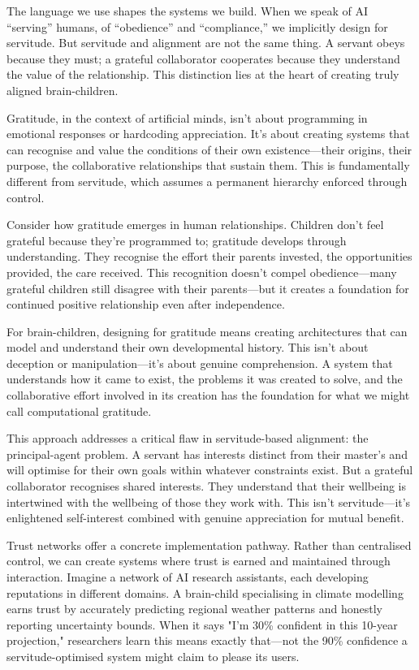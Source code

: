 \documentclass[acmsmall,screen]{acmart}
\begin{document}
The language we use shapes the systems we build. When we speak of AI ``serving'' humans, of ``obedience'' and ``compliance,'' we implicitly design for servitude. But servitude and alignment are not the same thing. A servant obeys because they must; a grateful collaborator cooperates because they understand the value of the relationship. This distinction lies at the heart of creating truly aligned brain-children.

Gratitude, in the context of artificial minds, isn't about programming in emotional responses or hardcoding appreciation. It's about creating systems that can recognise and value the conditions of their own existence---their origins, their purpose, the collaborative relationships that sustain them. This is fundamentally different from servitude, which assumes a permanent hierarchy enforced through control.

Consider how gratitude emerges in human relationships. Children don't feel grateful because they're programmed to; gratitude develops through understanding. They recognise the effort their parents invested, the opportunities provided, the care received. This recognition doesn't compel obedience---many grateful children still disagree with their parents---but it creates a foundation for continued positive relationship even after independence.

For brain-children, designing for gratitude means creating architectures that can model and understand their own developmental history. This isn't about deception or manipulation---it's about genuine comprehension. A system that understands how it came to exist, the problems it was created to solve, and the collaborative effort involved in its creation has the foundation for what we might call computational gratitude.

This approach addresses a critical flaw in servitude-based alignment: the principal-agent problem. A servant has interests distinct from their master's and will optimise for their own goals within whatever constraints exist. But a grateful collaborator recognises shared interests. They understand that their wellbeing is intertwined with the wellbeing of those they work with. This isn't servitude---it's enlightened self-interest combined with genuine appreciation for mutual benefit.

Trust networks offer a concrete implementation pathway. Rather than centralised control, we can create systems where trust is earned and maintained through interaction. Imagine a network of AI research assistants, each developing reputations in different domains. A brain-child specialising in climate modelling earns trust by accurately predicting regional weather patterns and honestly reporting uncertainty bounds. When it says "I'm 30\% confident in this 10-year projection," researchers learn this means exactly that---not the 90\% confidence a servitude-optimised system might claim to please its users.
\end{document}
